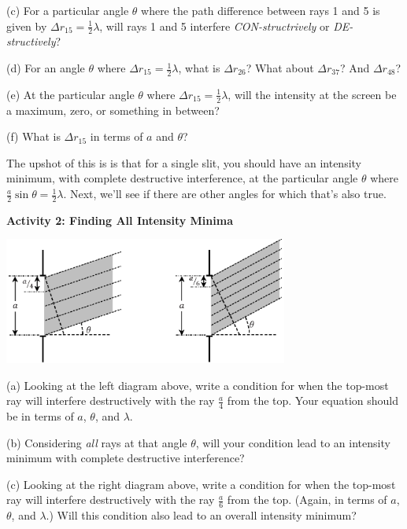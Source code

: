 (c) For a particular angle $\theta$ where the path difference between rays 1 and 5 is given by $\Delta r_{15}=\frac{1}{2}\lambda$, will rays 1 and 5 interfere \textit{CON-structrively} or \textit{DE-structively}?
\answerspace{0.4in}

(d) For an angle $\theta$ where $\Delta r_{15}=\frac{1}{2}\lambda$, what is $\Delta r_{26}$?  What about $\Delta r_{37}$? And $\Delta r_{48}$?
\answerspace{0.5in}

(e) At the particular angle $\theta$ where $\Delta r_{15}=\frac{1}{2}\lambda$, will the intensity at the screen be a maximum, zero, or something in between?
\answerspace{0.4in}

(f) What is $\Delta r_{15}$ in terms of $a$ and $\theta$?
\answerspace{0.4in}

The upshot of this is is that for a single slit, you should have an intensity minimum, with complete destructive interference, at the particular angle $\theta$ where $\frac{a}{2} \sin \theta = \frac{1}{2}\lambda$.  Next, we'll see if there are other angles for which that's also true.

\pagebreak[3]
\textbf{Activity 2: Finding All Intensity Minima}

\vspace{-0.2in}
\begin{center}
\includegraphics[width=0.7\textwidth]{diffraction_of_light/fourths_and_sixths.eps}
\end{center}
\vspace{-0.2in}

(a) Looking at the left diagram above, write a condition for when the top-most ray will interfere destructively with the ray $\frac{a}{4}$ from the top.  Your equation should be in terms of $a$, $\theta$, and $\lambda$.  
\answerspace{0.4in}

(b) Considering \textit{all} rays at that angle $\theta$, will your condition lead to an intensity minimum with complete destructive interference?
\answerspace{0.4in}

(c) Looking at the right diagram above, write a condition for when the top-most ray will interfere destructively with the ray $\frac{a}{6}$ from the top.  (Again, in terms of $a$, $\theta$, and $\lambda$.)  Will this condition also lead to an overall intensity minimum?
\answerspace{0.4in}

